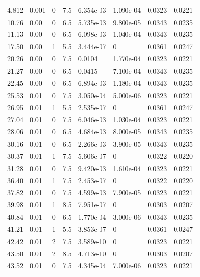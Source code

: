 \documentclass[preview]{standalone}
\begin{document}
{{\begin{tabular}{L{1.2cm}C{1.2cm} C{0.3cm}C{0.5cm} C{1.4cm}C{1.4cm} C{1.4cm}C{1.4cm}}
  4.812  &  0.001  & 0     & 7.5 &  6.354e-03  & 1.090e-04  & 0.0323 &  0.0221   \\ 
  10.76  &  0.00  & 0     & 6.5 &  5.735e-03  & 9.800e-05  & 0.0343 &  0.0235   \\ 
  11.13  &  0.00  & 0     & 6.5 &  6.098e-03  & 1.040e-04  & 0.0343 &  0.0235   \\ 
  17.50  &  0.00  & 1     & 5.5 &  3.444e-07  & 0  & 0.0361 &  0.0247   \\ 
  20.26  &  0.00  & 0     & 7.5 &  0.0104  & 1.770e-04  & 0.0323 &  0.0221   \\ 
  21.27  &  0.00  & 0     & 6.5 &  0.0415  & 7.100e-04  & 0.0343 &  0.0235   \\ 
  22.45  &  0.00  & 0     & 6.5 &  6.894e-03  & 1.180e-04  & 0.0343 &  0.0235   \\ 
  25.53  &  0.01  & 0     & 7.5 &  3.050e-04  & 5.000e-06  & 0.0323 &  0.0221   \\ 
  26.95  &  0.01  & 1     & 5.5 &  2.535e-07  & 0  & 0.0361 &  0.0247   \\ 
  27.04  &  0.01  & 0     & 7.5 &  6.046e-03  & 1.030e-04  & 0.0323 &  0.0221   \\ 
  28.06  &  0.01  & 0     & 6.5 &  4.684e-03  & 8.000e-05  & 0.0343 &  0.0235   \\ 
  30.16  &  0.01  & 0     & 6.5 &  2.266e-03  & 3.900e-05  & 0.0343 &  0.0235   \\ 
  30.37  &  0.01  & 1     & 7.5 &  5.606e-07  & 0  & 0.0322 &  0.0220   \\ 
  31.28  &  0.01  & 0     & 7.5 &  9.420e-03  & 1.610e-04  & 0.0323 &  0.0221   \\ 
  36.40  &  0.01  & 1     & 7.5 &  2.453e-07  & 0  & 0.0322 &  0.0220   \\ 
  37.82  &  0.01  & 0     & 7.5 &  4.599e-03  & 7.900e-05  & 0.0323 &  0.0221   \\ 
  39.98  &  0.01  & 1     & 8.5 &  7.951e-07  & 0  & 0.0303 &  0.0207   \\ 
  40.84  &  0.01  & 0     & 6.5 &  1.770e-04  & 3.000e-06  & 0.0343 &  0.0235   \\ 
  41.21  &  0.01  & 1     & 5.5 &  3.853e-07  & 0  & 0.0361 &  0.0247   \\ 
  42.42  &  0.01  & 2     & 7.5 &  3.589e-10  & 0  & 0.0323 &  0.0221   \\ 
  43.50  &  0.01  & 2     & 8.5 &  4.713e-10  & 0  & 0.0303 &  0.0207   \\ 
  43.52  &  0.01  & 0     & 7.5 &  4.345e-04  & 7.000e-06  & 0.0323 &  0.0221   \\ 

\end{tabular}}}
\end{document}
